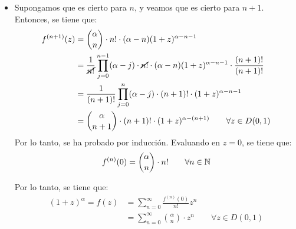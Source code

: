 \begin{ejercicio}
\begin{itemize}
        \item Supongamos que es cierto para $n$, y veamos que es cierto para $n+1$. Entonces, se tiene que:
        \begin{align*}
            f^{(n+1)}(z) &= \binom{\alpha}{n}\cdot n!\cdot (\alpha-n)(1+z)^{\alpha-n-1} \\
            &= \dfrac{1}{\cancel{n!}}\prod_{j=0}^{n-1} (\alpha-j)\cdot \cancel{n!}\cdot (\alpha-n)(1+z)^{\alpha-n-1}\cdot \dfrac{(n+1)!}{(n+1)!} \\
            &= \dfrac{1}{(n+1)!}\prod_{j=0}^{n} (\alpha-j)\cdot (n+1)!\cdot (1+z)^{\alpha-n-1} \\
            &= \binom{\alpha}{n+1}\cdot (n+1)!\cdot (1+z)^{\alpha-(n+1)} \qquad \forall z \in D(0,1)
        \end{align*}
        Por lo tanto, se ha probado por inducción. Evaluando en $z=0$, se tiene que:
        \begin{equation*}
            f^{(n)}(0) = \binom{\alpha}{n}\cdot n!\qquad \forall n \in \mathbb{N}
        \end{equation*}

        Por lo tanto, se tiene que:
        \begin{align*}
            (1+z)^{\alpha}=f(z) &= \sum_{n=0}^{\infty} \frac{f^{(n)}(0)}{n!} z^n \\
            &= \sum_{n=0}^{\infty} \binom{\alpha}{n}\cdot z^n\qquad \forall z \in D(0,1)
        \end{align*}
    \end{itemize}
\end{ejercicio}


